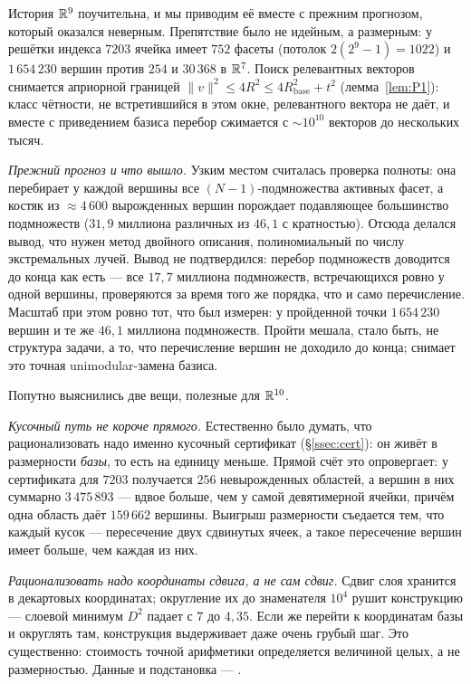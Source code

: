 \begin{enumerate}[leftmargin=1.5em]
\begin{itemize}[leftmargin=1.2em,itemsep=1pt]
История $\mathbb{R}^9$ поучительна, и мы приводим её вместе с прежним прогнозом,
который оказался неверным. Препятствие было не идейным, а размерным: у решётки
индекса $7203$ ячейка имеет $752$ фасеты (потолок $2(2^9-1)=1022$) и
$1\,654\,230$ вершин против $254$ и $30\,368$ в $\mathbb{R}^7$. Поиск релевантных
векторов снимается априорной границей $\|v\|^2\le4R^2\le4R_{\text{base}}^2+t^2$
(лемма~\ref{lem:P1}): класс чётности, не встретившийся в этом окне,
релевантного вектора не даёт, и вместе с приведением базиса перебор сжимается
с ${\sim}10^{10}$ векторов до нескольких тысяч.

\emph{Прежний прогноз и что вышло.} Узким местом считалась проверка полноты:
она перебирает у каждой вершины все $(N-1)$-подмножества активных фасет, а
костяк из ${\approx}4\,600$ вырожденных вершин порождает подавляющее
большинство подмножеств ($31{,}9$ миллиона различных из $46{,}1$ с
кратностью). Отсюда делался вывод, что нужен метод двойного описания,
полиномиальный по числу экстремальных лучей. Вывод не подтвердился: перебор
подмножеств доводится до конца как есть --- все $17{,}7$ миллиона подмножеств,
встречающихся ровно у одной вершины, проверяются за время того же порядка, что
и само перечисление. Масштаб при этом ровно тот, что был измерен: у пройденной
точки $1\,654\,230$ вершин и те же $46{,}1$ миллиона подмножеств. Пройти
мешала, стало быть, не структура задачи, а то, что перечисление вершин не
доходило до конца; снимает это точная unimodular-замена базиса.

Попутно выяснились две вещи, полезные для $\mathbb{R}^{10}$.

\emph{Кусочный путь не короче прямого.} Естественно было думать, что
рационализовать надо именно кусочный сертификат (\S\ref{ssec:cert}): он живёт в
размерности \emph{базы}, то есть на единицу меньше. Прямой счёт это опровергает:
у сертификата для $7203$ получается $256$ невырожденных областей, а вершин в них
суммарно $3\,475\,893$ --- вдвое больше, чем у самой девятимерной ячейки, причём
одна область даёт $159\,662$ вершины. Выигрыш размерности съедается тем, что
каждый кусок --- пересечение двух сдвинутых ячеек, а такое пересечение вершин
имеет больше, чем каждая из них.

\emph{Рационализовать надо координаты сдвига, а не сам сдвиг.} Сдвиг слоя
хранится в декартовых координатах; округление их до знаменателя $10^4$ рушит
конструкцию --- слоевой минимум $D^2$ падает с $7$ до $4{,}35$. Если же перейти
к координатам базы и округлять там, конструкция выдерживает даже очень грубый
шаг. Это существенно: стоимость точной арифметики определяется величиной целых,
а не размерностью. Данные и подстановка ---
.


\end{itemize}
\end{enumerate}
